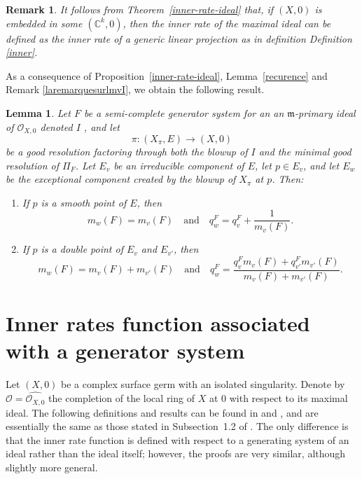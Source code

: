 \documentclass[reqno,dvipsnames,12pt]{amsart}
\newtheorem{lemm}[thm]{Lemma}
\newtheorem{rema}[thm]{Remark}
\begin{document}
		\begin{rema}
	It follows from Theorem~\ref{inner-rate-ideal} that, if $(X,0)$ is embedded in some $(\mathbb{C}^k,0)$, then the inner rate of the maximal ideal can be defined as the inner rate of a generic linear projection as in definition Definition \ref{inner}.
		\end{rema}

As a consequence of Proposition~\ref{inner-rate-ideal}, Lemma~\ref{recurence} and Remark \ref{laremarquesurlmvI}, we obtain the following result.

\begin{lemm}\label{recurenceI}
Let $F$ be a semi-complete generator system for an an $\mathfrak{m}$-primary ideal of $\mathcal{O}_{X,0}$ denoted $I$ , and let
\[
\pi :(X_{\pi},E) \longrightarrow (X,0)
\]
be a good resolution factoring through both the blowup of $I$ and the minimal good resolution  of $\Pi_F$.
Let $E_v$ be an irreducible component of $E$, let $p\in E_v$, and let $E_{w}$ be the exceptional component created by the blowup of $X_{\pi}$ at $p$. Then:
\begin{enumerate}
\item If $p$ is a smooth point of $E$, then
\[
m_w(F)=m_v(F)
\quad\text{and}\quad
q_{w}^{F}=q_{v}^{F}+\frac{1}{m_v(F)}.
\]

\item If $p$ is a double point of $E_v$ and $E_{v'}$, then
\[
m_w(F)=m_v(F)+m_{v'}(F)
\quad\text{and}\quad
q_{w}^F=\frac{q_{v}^F m_v(F) + q_{v'}^F m_{v'}(F)}{m_v(F)+m_{v'}(F)}.
\]
\end{enumerate}
\end{lemm}


   \section{Inner rates function associated with a generator system}\label{section4}
Let $(X,0)$ be a complex surface germ with an isolated singularity. Denote by
$\mathcal{O} = \widehat{\mathcal{O}_{X,0}}$ the completion of the local ring of $X$ at $0$ with respect to its maximal ideal. The following definitions and results can be found in \cite[Preliminaries]{BFP} and \cite[Section 2]{GignacRuggiero2017}, and are essentially the same as those stated in Subsection~1.2 of \cite{yenni2}. The only difference is that the inner rate function is defined with respect to a generating system of an ideal rather than the ideal itself; however, the proofs are very similar, although slightly more general.
\end{document}
